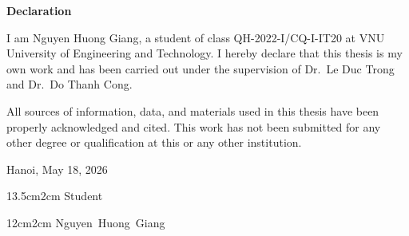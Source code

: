 \setcounter{page}{1}
\begin{center}
\textbf{\large{Declaration}}
\end{center}
I am Nguyen Huong Giang, a student of class QH-2022-I/CQ-I-IT20 at VNU University of Engineering and Technology. I hereby declare that this thesis is my own work and has been carried out under the supervision of Dr.\ Le Duc Trong and Dr.\ Do Thanh Cong.

All sources of information, data, and materials used in this thesis have been properly acknowledged and cited. This work has not been submitted for any other degree or qualification at this or any other institution.

\begin{flushright}
Hanoi, May 18, 2026 
\end{flushright}

\begin{changemargin}{13.5cm}{2cm}
Student
\\[2cm]
\end{changemargin}

\begin{changemargin}{12cm}{2cm}
\mbox{Nguyen Huong Giang}
\end{changemargin}



